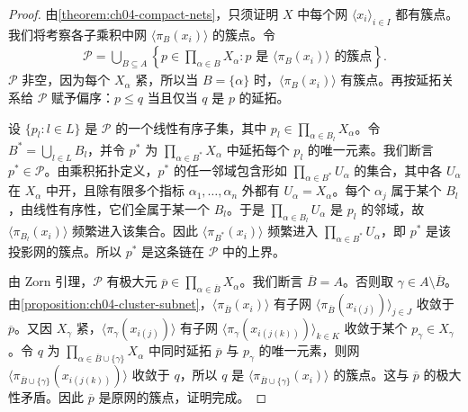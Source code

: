 \documentclass[../../main.tex]{subfiles}%
\begin{document}
\begin{proof}
由\cref{theorem:ch04-compact-nets}，只须证明 $X$ 中每个网 $\langle x_i\rangle_{i\in I}$ 都有簇点。我们将考察各子乘积中网 $\langle\pi_B(x_i)\rangle$ 的簇点。令
\begin{align*}
\mathcal P=\bigcup_{B\subseteq A}\left\{p\in\prod_{\alpha\in B}X_\alpha:
p\text{ 是 }\langle\pi_B(x_i)\rangle\text{ 的簇点}\right\}.
\end{align*}
$\mathcal P$ 非空，因为每个 $X_\alpha$ 紧，所以当 $B=\{\alpha\}$ 时，$\langle\pi_B(x_i)\rangle$ 有簇点。再按延拓关系给 $\mathcal P$ 赋予偏序：$p\le q$ 当且仅当 $q$ 是 $p$ 的延拓。

设 $\{p_l:l\in L\}$ 是 $\mathcal P$ 的一个线性有序子集，其中 $p_l\in\prod_{\alpha\in B_l}X_\alpha$。令 $B^*=\bigcup_{l\in L}B_l$，并令 $p^*$ 为 $\prod_{\alpha\in B^*}X_\alpha$ 中延拓每个 $p_l$ 的唯一元素。我们断言 $p^*\in\mathcal P$。由乘积拓扑定义，$p^*$ 的任一邻域包含形如 $\prod_{\alpha\in B^*}U_\alpha$ 的集合，其中各 $U_\alpha$ 在 $X_\alpha$ 中开，且除有限多个指标 $\alpha_1,\ldots,\alpha_n$ 外都有 $U_\alpha=X_\alpha$。每个 $\alpha_j$ 属于某个 $B_l$，由线性有序性，它们全属于某一个 $B_l$。于是 $\prod_{\alpha\in B_l}U_\alpha$ 是 $p_l$ 的邻域，故 $\langle\pi_{B_l}(x_i)\rangle$ 频繁进入该集合。因此 $\langle\pi_{B^*}(x_i)\rangle$ 频繁进入 $\prod_{\alpha\in B^*}U_\alpha$，即 $p^*$ 是该投影网的簇点。所以 $p^*$ 是这条链在 $\mathcal P$ 中的上界。

由 Zorn 引理，$\mathcal P$ 有极大元 $\overline p\in\prod_{\alpha\in\overline B}X_\alpha$。我们断言 $\overline B=A$。否则取 $\gamma\in A\setminus\overline B$。由\cref{proposition:ch04-cluster-subnet}，$\langle\pi_{\overline B}(x_i)\rangle$ 有子网 $\langle\pi_{\overline B}(x_{i(j)})\rangle_{j\in J}$ 收敛于 $\overline p$。又因 $X_\gamma$ 紧，$\langle\pi_\gamma(x_{i(j)})\rangle$ 有子网 $\langle\pi_\gamma(x_{i(j(k))})\rangle_{k\in K}$ 收敛于某个 $p_\gamma\in X_\gamma$。令 $q$ 为 $\prod_{\alpha\in\overline B\cup\{\gamma\}}X_\alpha$ 中同时延拓 $\overline p$ 与 $p_\gamma$ 的唯一元素，则网 $\langle\pi_{\overline B\cup\{\gamma\}}(x_{i(j(k))})\rangle$ 收敛于 $q$，所以 $q$ 是 $\langle\pi_{\overline B\cup\{\gamma\}}(x_i)\rangle$ 的簇点。这与 $\overline p$ 的极大性矛盾。因此 $\overline p$ 是原网的簇点，证明完成。
\end{proof}
\end{document}
